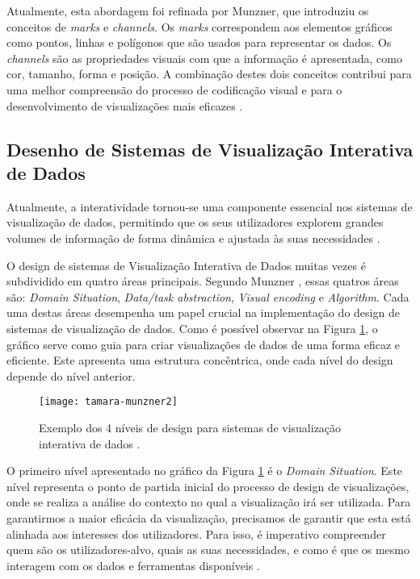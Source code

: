 Atualmente, esta abordagem foi refinada por Munzner, que introduziu os conceitos de \textit{marks} e \textit{channels}. Os \textit{marks} correspondem aos elementos gráficos como pontos, linhas e polígonos que são usados para representar os dados. Os \textit{channels} são as propriedades visuais com que a informação é apresentada, como cor, tamanho, forma e posição. A combinação destes dois conceitos contribui para uma melhor compreensão do processo de codificação visual e para o desenvolvimento de visualizações mais eficazes \cite{munzner2014visualization}.

\subsection{Desenho de Sistemas de Visualização Interativa de Dados} %
\label{sub:desenho_sistemas_vis}

Atualmente, a interatividade tornou-se uma componente essencial nos sistemas de visualização de dados, permitindo que os seus utilizadores explorem grandes volumes de informação de forma dinâmica e ajustada às suas necessidades \cite{keim2002information}. 

O design de sistemas de Visualização Interativa de Dados muitas vezes é subdividido em quatro áreas principais. Segundo Munzner \cite{munzner2014visualization}, essas quatros áreas são: \textit{Domain Situation}, \textit{Data/task abstraction}, \textit{Visual encoding} e \textit{Algorithm}. Cada uma destas áreas desempenha um papel crucial na implementação do design de sistemas de visualização de dados. Como é possível observar na Figura \ref{fig:tamara-munzner-principles}, o gráfico serve como guia para criar visualizações de dados de uma forma eficaz e eficiente. Este apresenta uma estrutura concêntrica, onde cada nível do design depende do nível anterior.

\begin{figure}[htbp]
  \centering
  \texttt{[image: tamara-munzner2]}
  \caption{Exemplo dos 4 níveis de design para sistemas de visualização interativa de dados \cite{munzner2014visualization}.}
  \label{fig:tamara-munzner-principles}
\end{figure}

O primeiro nível apresentado no gráfico da Figura \ref{fig:tamara-munzner-principles} é o \textit{Domain Situation}. Este nível representa o ponto de partida inicial do processo de design de visualizações, onde se realiza a análise do contexto no qual a visualização irá ser utilizada.
Para garantirmos a maior eficácia da visualização, precisamos de garantir que esta está alinhada aos interesses dos utilizadores. Para isso, é imperativo compreender quem são os utilizadores-alvo, quais as suas necessidades, e como é que os mesmo interagem com os dados e ferramentas disponíveis \cite{courage2005understanding}.

